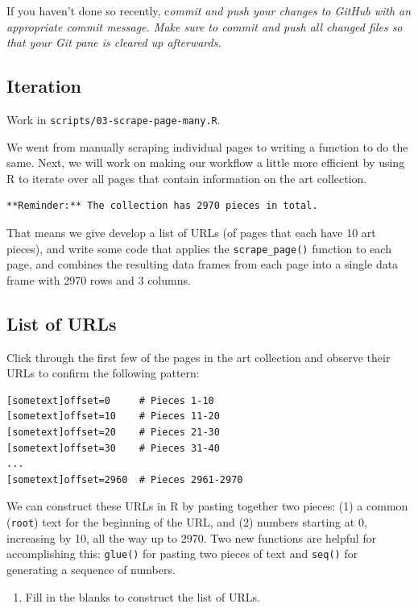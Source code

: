 \documentclass[
]{article}
\providecommand{\tightlist}{%
  \setlength{\itemsep}{0pt}\setlength{\parskip}{0pt}}
\begin{document}
If you haven't done so recently, c\emph{ommit and push your changes to
GitHub with an appropriate commit message. Make sure to commit and push
all changed files so that your Git pane is cleared up afterwards.}

\subsection{Iteration}\label{iteration}

Work in \texttt{scripts/03-scrape-page-many.R}.

We went from manually scraping individual pages to writing a function to
do the same. Next, we will work on making our workflow a little more
efficient by using R to iterate over all pages that contain information
on the art collection.

\begin{verbatim}
**Reminder:** The collection has 2970 pieces in total.
\end{verbatim}

That means we give develop a list of URLs (of pages that each have 10
art pieces), and write some code that applies the
\texttt{scrape\_page()} function to each page, and combines the
resulting data frames from each page into a single data frame with 2970
rows and 3 columns.

\subsection{List of URLs}\label{list-of-urls}

Click through the first few of the pages in the art collection and
observe their URLs to confirm the following pattern:

\begin{verbatim}
[sometext]offset=0     # Pieces 1-10
[sometext]offset=10    # Pieces 11-20
[sometext]offset=20    # Pieces 21-30
[sometext]offset=30    # Pieces 31-40
...
[sometext]offset=2960  # Pieces 2961-2970
\end{verbatim}

We can construct these URLs in R by pasting together two pieces: (1) a
common (\texttt{root}) text for the beginning of the URL, and (2)
numbers starting at 0, increasing by 10, all the way up to 2970. Two new
functions are helpful for accomplishing this: \texttt{glue()} for
pasting two pieces of text and \texttt{seq()} for generating a sequence
of numbers.

\begin{enumerate}
\def\labelenumi{\arabic{enumi}.}
\setcounter{enumi}{5}
\tightlist
\item
  Fill in the blanks to construct the list of URLs.
\end{enumerate}
\end{document}
